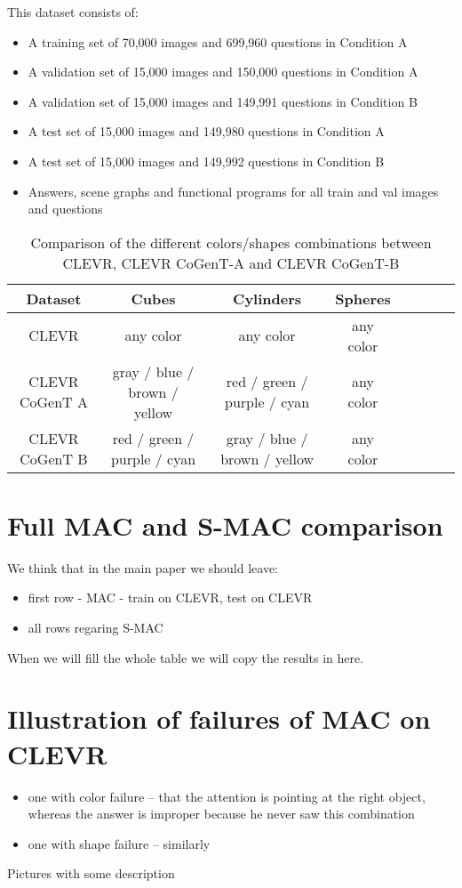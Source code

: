 This dataset consists of:
\begin{itemize}
\item	A training set of 70,000 images and 699,960 questions in Condition A
\item	A validation set of 15,000 images and 150,000 questions in Condition A
\item	A validation set of 15,000 images and 149,991 questions in Condition B
\item	A test set of 15,000 images and 149,980 questions in Condition A
\item	A test set of 15,000 images and 149,992 questions in Condition B
\item	Answers, scene graphs and functional programs for all train and val images and questions
\end{itemize}

\begin{table}
	\centering
	\begin{tabular}{ccccCcCc}
		\toprule
		Dataset        & Cubes              & Cylinders &  Spheres         \\
		\midrule
		CLEVR   &  any color &  any color        &    any color    \\
		CLEVR CoGenT A & gray / blue / brown / yellow  & red / green / purple / cyan       &    any color  \\
		CLEVR CoGenT B  & red / green / purple / cyan &   gray / blue / brown / yellow       &      any color  \\
		\bottomrule
	\end{tabular}
	\caption{Comparison of the different colors/shapes combinations between CLEVR, CLEVR CoGenT-A and CLEVR CoGenT-B  }
	\label{tab:parameters}
\end{table}

\section{Full MAC and S-MAC comparison}

We think that in the main paper we should leave:
\begin{itemize}
\item first row - MAC - train on CLEVR, test on CLEVR 
\item all rows regaring S-MAC
\end{itemize}

When we will fill the whole table we will copy the results in here.

\section{Illustration of failures of MAC on CLEVR}

\begin{itemize}
\item one with color failure -- that the attention is pointing at the right object, whereas the answer is improper because he never saw this combination
\item one with shape failure -- similarly	
\end{itemize}
Pictures with some description